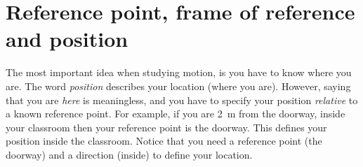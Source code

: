             \section{Reference point, frame of reference and position}
            \nopagebreak
      \label{m38787*id62597}The most important idea when studying motion, is you have to know where you are. The word \textsl{position} describes your location (where you are). However, saying that you are \textsl{here} is meaningless, and you have to specify your position \textsl{relative} to a known reference point. For example, if you are 2~m from the doorway, inside your classroom then your reference point is the doorway. This defines your position inside the classroom. Notice that you need a reference point (the doorway) and a direction (inside) to define your location.\par 
      \label{m38787*uid4}
